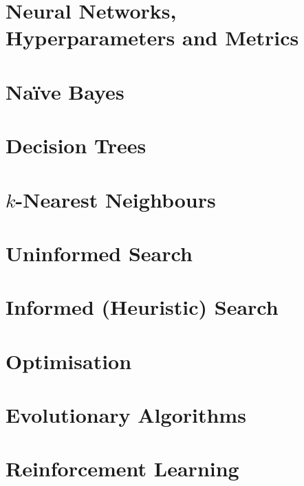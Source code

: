 \documentclass[
  11pt,
  a4paper,
]{article}
\begin{document}
\section{Neural Networks, Hyperparameters and Metrics}


\section{Na\"{i}ve Bayes}


\section{Decision Trees}


\section{\texorpdfstring{\( k \)}{k}-Nearest Neighbours}


\section{Uninformed Search}


\section{Informed (Heuristic) Search}


\section{Optimisation}


\section{Evolutionary Algorithms}


\section{Reinforcement Learning}

\end{document}
